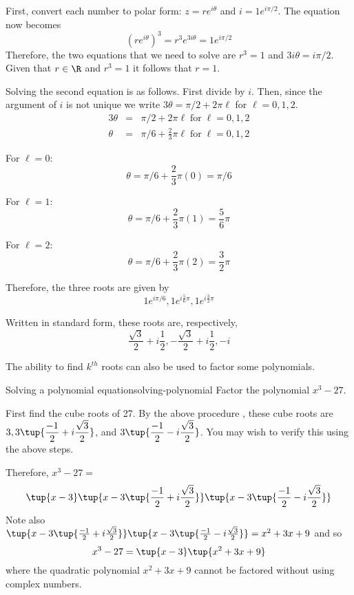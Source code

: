 \begin{solution}
First, convert each number to polar form: $z = re^{i\theta}$ and $i = 1 e^{i \pi/2}$. The equation now becomes
\[
(re^{i\theta})^3 = r^3 e^{3i\theta} = 1 e^{i \pi/2}
\]
Therefore, the two equations that we need to solve are $r^3 = 1$ and $3i\theta = i \pi/2$. Given that $r \in \R$ and $r^3 = 1$ it follows that $r=1$. 

Solving the second equation is as follows. First divide by $i$. Then, since the argument of $i$ is not unique we write $3\theta = \pi/2 + 2\pi\ell$ for $\ell = 0,1,2$. 
\begin{eqnarray*}
3\theta &=& \pi/2 + 2\pi\ell \; \mbox{for} \; \ell = 0,1,2 \\
\theta &=& \pi/6 + \frac{2}{3} \pi\ell \; \mbox{for} \; \ell = 0,1,2 
\end{eqnarray*}

For $\ell = 0$:
\[
\theta = \pi/6 + \frac{2}{3} \pi (0) = \pi/6
\]

For $\ell = 1$:
\[
\theta = \pi/6 + \frac{2}{3} \pi(1) = \frac{5}{6} \pi
\]

For $\ell = 2$:
\[
\theta = \pi/6 + \frac{2}{3} \pi(2) = \frac{3}{2} \pi
\]

Therefore, the three roots are given by \[
1e^{i \pi/6}, 1e^{i \frac{5}{6}\pi}, 1e^{i \frac{3}{2}\pi}
\]

Written in standard form, these roots are, respectively,
\[
\frac{\sqrt{3}}{2} + i \frac{1}{2}, -\frac{\sqrt{3}}{2} + i \frac{1}{2}, -i
\]

\end{solution}

The ability to find $k^{th}$ roots can also be used to factor some
polynomials.

\begin{example}{Solving a polynomial equation}{solving-polynomial}
Factor the polynomial $x^{3}-27$.
\end{example}

\begin{solution}
First find the cube roots of 27. By the above procedure
, these cube roots
are $3,3\tup{\displaystyle
\frac{-1}{2}+i\displaystyle\frac{\sqrt{3}}{2}} $, and $3\tup{
\displaystyle\frac{-1}{2}-i\displaystyle\frac{\sqrt{3}}{2}} $. You may wish to verify 
this using the above steps.

Therefore, $x^{3}-27 =$
\begin{equation*}
 \tup{x-3} \tup{x-3\tup{\frac{-1}{2}+i\frac{\sqrt{3}}{2}}
} \tup{x-3\tup{\frac{-1}{2}-i\frac{\sqrt{3}}{2}} } 
\end{equation*}
Note also $\tup{x-3\tup{\frac{-1}{2}+i\frac{\sqrt{3}}{2}} }
\tup{x-3\tup{\frac{-1}{2}-i\frac{\sqrt{3}}{2}} }
=\allowbreak x^{2}+3x+9$ and so
\begin{equation*}
x^{3}-27=\tup{x-3} \tup{x^{2}+3x+9}
\end{equation*}
where the quadratic polynomial $x^{2}+3x+9$ cannot be factored without using
complex numbers.
\end{solution}

